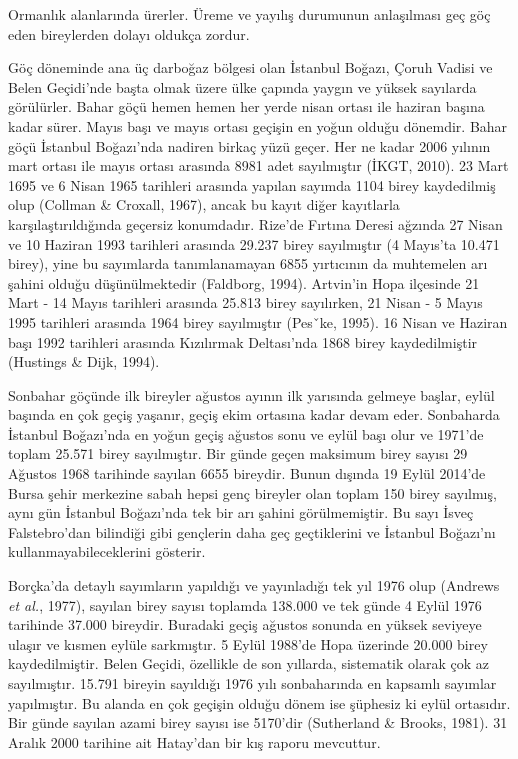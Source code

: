 \documentclass[
  a4paper,
  DIV=11,
  numbers=noendperiod]{scrreprt}
\begin{document}
Ormanlık alanlarında ürerler. Üreme ve yayılış durumunun anlaşılması geç
göç eden bireylerden dolayı oldukça zordur.

Göç döneminde ana üç darboğaz bölgesi olan İstanbul Boğazı, Çoruh Vadisi
ve Belen Geçidi'nde başta olmak üzere ülke çapında yaygın ve yüksek
sayılarda görülürler. Bahar göçü hemen hemen her yerde nisan ortası ile
haziran başına kadar sürer. Mayıs başı ve mayıs ortası geçişin en yoğun
olduğu dönemdir. Bahar göçü İstanbul Boğazı'nda nadiren birkaç yüzü
geçer. Her ne kadar 2006 yılının mart ortası ile mayıs ortası arasında
8981 adet sayılmıştır (İKGT, 2010). 23 Mart 1695 ve 6 Nisan 1965
tarihleri arasında yapılan sayımda 1104 birey kaydedilmiş olup (Collman
\& Croxall, 1967), ancak bu kayıt diğer kayıtlarla karşılaştırıldığında
geçersiz konumdadır. Rize'de Fırtına Deresi ağzında 27 Nisan ve 10
Haziran 1993 tarihleri arasında 29.237 birey sayılmıştır (4 Mayıs'ta
10.471 birey), yine bu sayımlarda tanımlanamayan 6855 yırtıcının da
muhtemelen arı şahini olduğu düşünülmektedir (Faldborg, 1994). Artvin'in
Hopa ilçesinde 21 Mart - 14 Mayıs tarihleri arasında 25.813 birey
sayılırken, 21 Nisan - 5 Mayıs 1995 tarihleri arasında 1964 birey
sayılmıştır (Pesˇke, 1995). 16 Nisan ve Haziran başı 1992 tarihleri
arasında Kızılırmak Deltası'nda 1868 birey kaydedilmiştir (Hustings \&
Dijk, 1994).

Sonbahar göçünde ilk bireyler ağustos ayının ilk yarısında gelmeye
başlar, eylül başında en çok geçiş yaşanır, geçiş ekim ortasına kadar
devam eder. Sonbaharda İstanbul Boğazı'nda en yoğun geçiş ağustos sonu
ve eylül başı olur ve 1971'de toplam 25.571 birey sayılmıştır. Bir günde
geçen maksimum birey sayısı 29 Ağustos 1968 tarihinde sayılan 6655
bireydir. Bunun dışında 19 Eylül 2014'de Bursa şehir merkezine sabah
hepsi genç bireyler olan toplam 150 birey sayılmış, aynı gün İstanbul
Boğazı'nda tek bir arı şahini görülmemiştir. Bu sayı İsveç Falstebro'dan
bilindiği gibi gençlerin daha geç geçtiklerini ve İstanbul Boğazı'nı
kullanmayabileceklerini gösterir.

Borçka'da detaylı sayımların yapıldığı ve yayınladığı tek yıl 1976 olup
(Andrews \emph{et al.}, 1977), sayılan birey sayısı toplamda 138.000 ve
tek günde 4 Eylül 1976 tarihinde 37.000 bireydir. Buradaki geçiş ağustos
sonunda en yüksek seviyeye ulaşır ve kısmen eylüle sarkmıştır. 5 Eylül
1988'de Hopa üzerinde 20.000 birey kaydedilmiştir. Belen Geçidi,
özellikle de son yıllarda, sistematik olarak çok az sayılmıştır. 15.791
bireyin sayıldığı 1976 yılı sonbaharında en kapsamlı sayımlar
yapılmıştır. Bu alanda en çok geçişin olduğu dönem ise şüphesiz ki eylül
ortasıdır. Bir günde sayılan azami birey sayısı ise 5170'dir (Sutherland
\& Brooks, 1981). 31 Aralık 2000 tarihine ait Hatay'dan bir kış raporu
mevcuttur.
\end{document}
